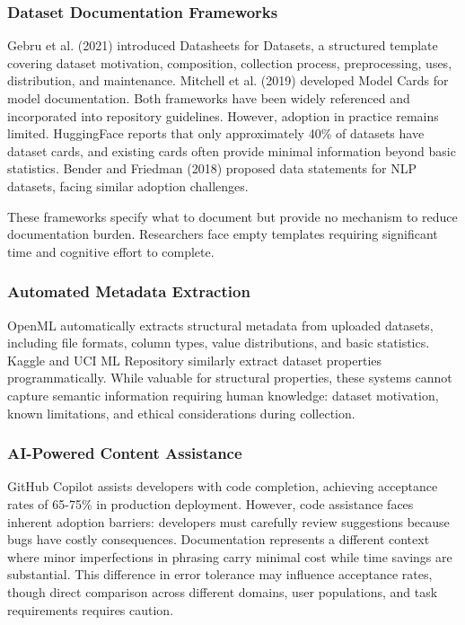 
\subsubsection{Dataset Documentation Frameworks}

Gebru et al. (2021) introduced Datasheets for Datasets, a structured template covering dataset motivation, composition, collection process, preprocessing, uses, distribution, and maintenance. Mitchell et al. (2019) developed Model Cards for model documentation. Both frameworks have been widely referenced and incorporated into repository guidelines. However, adoption in practice remains limited. HuggingFace reports that only approximately 40\% of datasets have dataset cards, and existing cards often provide minimal information beyond basic statistics. Bender and Friedman (2018) proposed data statements for NLP datasets, facing similar adoption challenges.

These frameworks specify what to document but provide no mechanism to reduce documentation burden. Researchers face empty templates requiring significant time and cognitive effort to complete.

\subsubsection{Automated Metadata Extraction}

OpenML automatically extracts structural metadata from uploaded datasets, including file formats, column types, value distributions, and basic statistics. Kaggle and UCI ML Repository similarly extract dataset properties programmatically. While valuable for structural properties, these systems cannot capture semantic information requiring human knowledge: dataset motivation, known limitations, and ethical considerations during collection.

\subsubsection{AI-Powered Content Assistance}

GitHub Copilot assists developers with code completion, achieving acceptance rates of 65-75\% in production deployment. However, code assistance faces inherent adoption barriers: developers must carefully review suggestions because bugs have costly consequences. Documentation represents a different context where minor imperfections in phrasing carry minimal cost while time savings are substantial. This difference in error tolerance may influence acceptance rates, though direct comparison across different domains, user populations, and task requirements requires caution.
